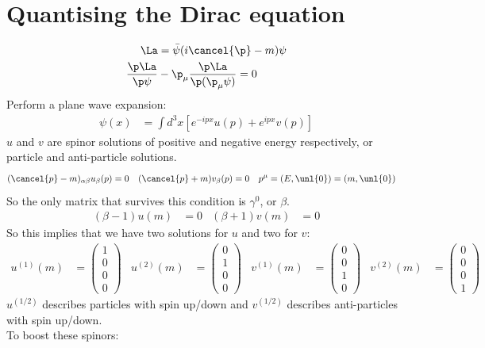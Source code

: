 \documentclass[a4paper, 11pt, normalem]{report}
\begin{document}
\section{Quantising the Dirac equation}
\begin{align}
    \La &= \bar{\psi}(i\cancel{\p}-m)\psi  \\
    \frac{\p\La}{\p\psi} &- \p_\mu\frac{\p\La}{\p(\p_\mu\psi)} = 0
\end{align}
Perform a plane wave expansion:
\begin{align}
    \psi(x) &= \int d^3x \left[e^{-ipx}u(p)+e^{ipx}v(p)\right]
\end{align}
$u$ and $v$ are spinor solutions of positive and negative energy respectively, or particle and anti-particle solutions.
\begin{align}
    (\cancel{p}-m)_{\alpha\beta}u_\beta(p) &= 0 & (\cancel{p}+m)v_\beta(p) &= 0 & p^\mu &= (E,\unl{0}) = (m,\unl{0})
\end{align}
So the only matrix that survives this condition is $\gamma^0$, or $\beta$.
\begin{align}
    (\beta-1)u(m) &= 0 & (\beta+1)v(m) &= 0
\end{align}
So this implies that we have two solutions for $u$ and two for $v$:
\begin{align}
    u^{(1)}(m) &= \begin{pmatrix} 1\\0\\0\\0\end{pmatrix} & u^{(2)}(m) &= \begin{pmatrix} 0\\1\\0\\0\end{pmatrix} & v^{(1)}(m) &= \begin{pmatrix} 0\\0\\1\\0\end{pmatrix} & v^{(2)}(m) &= \begin{pmatrix} 0\\0\\0\\1\end{pmatrix}
\end{align}
$u^{(1/2)}$ describes particles with spin up/down and $v^{(1/2)}$ describes anti-particles with spin up/down.\\
To boost these spinors:
\end{document}
